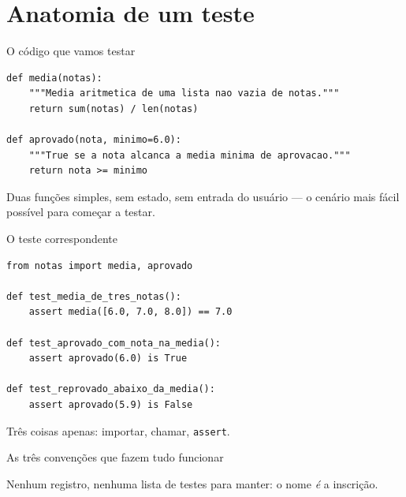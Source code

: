 \documentclass[aspectratio=169]{beamer}
\begin{document}
\section{Anatomia de um teste}

\begin{frame}[fragile]{O código que vamos testar}
\begin{lstlisting}[caption={notas.py}]
def media(notas):
    """Media aritmetica de uma lista nao vazia de notas."""
    return sum(notas) / len(notas)

def aprovado(nota, minimo=6.0):
    """True se a nota alcanca a media minima de aprovacao."""
    return nota >= minimo
\end{lstlisting}
  \small Duas funções simples, sem estado, sem entrada do usuário ---
  o cenário mais fácil possível para começar a testar.
\end{frame}

\begin{frame}[fragile]{O teste correspondente}
\begin{lstlisting}[caption={test\_notas.py}]
from notas import media, aprovado

def test_media_de_tres_notas():
    assert media([6.0, 7.0, 8.0]) == 7.0

def test_aprovado_com_nota_na_media():
    assert aprovado(6.0) is True

def test_reprovado_abaixo_da_media():
    assert aprovado(5.9) is False
\end{lstlisting}
  \small Três coisas apenas: importar, chamar, \texttt{assert}.
\end{frame}

\begin{frame}{As três convenções que fazem tudo funcionar}
  \begin{center}
  \end{center}
  \vspace{0.3em}
  \small Nenhum registro, nenhuma lista de testes para manter:
  o nome \emph{é} a inscrição.
\end{frame}
\end{document}
